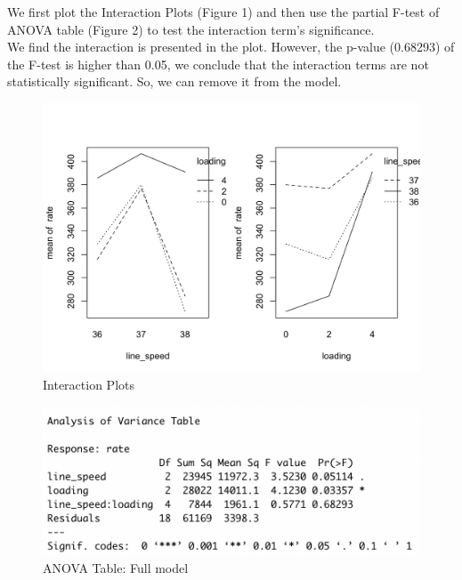 \documentclass[11pt,a4paper]{article}
\begin{document}
We first plot the Interaction Plots (Figure 1) and then use the partial F-test of ANOVA table (Figure 2) to test the interaction term's significance.\\
We find the interaction is presented in the plot. However, the p-value (0.68293) of the F-test is higher than 0.05, we conclude that the interaction terms are not statistically significant. So, we can remove it from the model.\\
\begin{figure}[htb]
    \centering
    \includegraphics[scale=0.3]{inter1.png}
    \caption{Interaction Plots}
    \label{}
\end{figure}
\begin{figure}[htb]
    \centering
    \includegraphics[scale=0.8]{inter2.png}
    \caption{ANOVA Table: Full model}
    \label{}
\end{figure}
\end{document}
